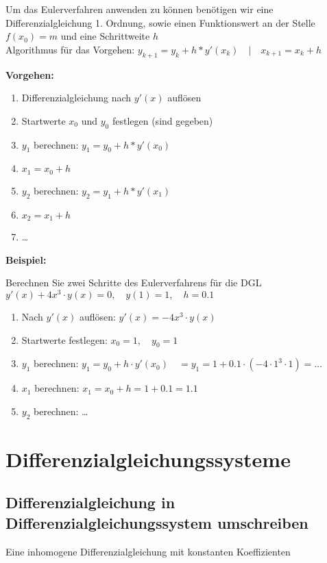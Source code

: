 \documentclass[12pt, a4paper]{scrreprt}
\begin{document}
Um das Eulerverfahren anwenden zu können benötigen wir eine Differenzialgleichung 1. Ordnung, sowie einen Funktionswert an der Stelle \(f(x_0) = m\) und eine Schrittweite \(h\)\\[1em]
Algorithmus für das Vorgehen: \(y_{k+1} = y_k + h * y'(x_k) \quad | \quad x_{k+1} = x_k + h\)

\textbf{Vorgehen:}
\begin{enumerate}
\item Differenzialgleichung nach \(y'(x)\) auflösen
\item Startwerte \(x_0\) und \(y_0\) festlegen (sind gegeben)
\item \(y_1\) berechnen: \(y_1 = y_0 + h * y'(x_0)\)
\item \(x_1 = x_0 + h\)
\item \(y_2\) berechnen: \(y_2 = y_1 + h * y'(x_1)\)
\item \(x_2 = x_1 + h\)
\item \dots
\end{enumerate}

\textbf{Beispiel:}

\glqq{} Berechnen Sie zwei Schritte des Eulerverfahrens für die DGL \(y'(x) + 4x^3 \cdot y(x) = 0, \quad y(1)= 1,\quad h = 0.1\) \grqq{}

\begin{enumerate}
\item Nach \(y'(x)\) auflösen: \(y'(x) = -4x^3 \cdot y(x)\)
\item Startwerte festlegen: \(x_0 = 1,\quad y_0 = 1\)
\item \(y_1\) berechnen: \(y_1 = y_0 + h \cdot y'(x_0)\quad = y_1 = 1 + 0.1 \cdot (-4\cdot1^3 \cdot 1) = \dots\)
\item \(x_1\) berechnen: \(x_1 = x_0 + h = 1 + 0.1 = 1.1\)
\item \(y_2\) berechnen: \dots
\end{enumerate}

\section{Differenzialgleichungssysteme}

\subsection{Differenzialgleichung in Differenzialgleichungssystem umschreiben}

Eine inhomogene Differenzialgleichung mit konstanten Koeffizienten
\end{document}
